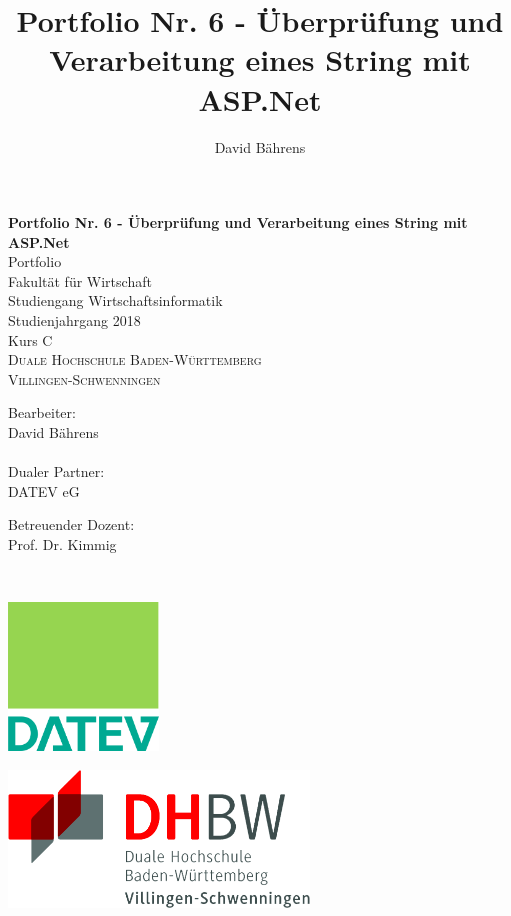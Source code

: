 \documentclass[a4paper,
12pt,
oneside]
{article}
\author{David Bährens}
\title{Portfolio Nr. 6 - Überprüfung und Verarbeitung eines String mit ASP.Net}
\begin{document}
	\begin{titlepage}
		\begin{center}
			\textbf{\huge Portfolio Nr. 6 - Überprüfung und Verarbeitung eines String mit ASP.Net} \\ \vspace{1.5cm}
			{\LARGE Portfolio} \\ \vspace{1cm}
			{\large
				Fakultät für Wirtschaft \\
				Studiengang Wirtschaftsinformatik \\
				Studienjahrgang 2018 \\ 
				Kurs C} \\ \vspace{1cm}
			\textsc{\LARGE 
				Duale Hochschule Baden-Württemberg \\
				Villingen-Schwenningen} \\ \vspace{1.5cm}
			\large
			\begin{minipage}[t]{.48\textwidth}
				Bearbeiter: \\
				David Bährens \\
				\\
				Dualer Partner: \\
				DATEV eG \\
			\end{minipage}
			\begin{minipage}[t]{.48\textwidth}
				Betreuender Dozent: \\
				Prof. Dr. Kimmig \\
			\end{minipage}
			\\ \vspace{0.5cm}
			\begin{minipage}[t]{.48\textwidth}
				\includegraphics[width=4cm]{img/datev.png}
			\end{minipage}
			\begin{minipage}[t]{.48\textwidth}
				\includegraphics[width=8cm]{img/dhbw.png}
			\end{minipage}
		\end{center}
	\end{titlepage}
	\clearpage
	
\end{document}
